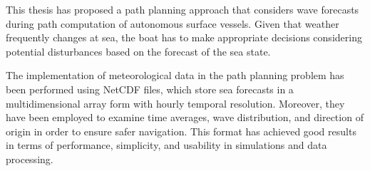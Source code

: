 \label{conclusions}
This thesis has proposed a path planning approach that considers wave forecasts during path computation of autonomous surface vessels. Given that weather frequently changes at sea, the boat has to make appropriate decisions considering potential disturbances based on the forecast of the sea state.

The implementation of meteorological data in the path planning problem has been performed using NetCDF files, which store sea forecasts in a multidimensional array form with hourly temporal resolution. Moreover, they have been employed to examine time averages, wave distribution, and direction of origin in order to ensure safer navigation. This format has achieved good results in terms of performance, simplicity, and usability in simulations and data processing.

